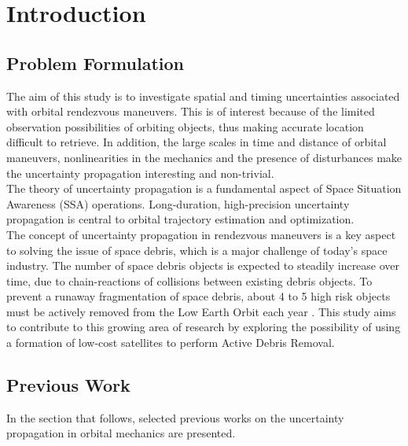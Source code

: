 \section{Introduction}

\subsection{Problem Formulation}

The aim of this study is to investigate spatial and timing uncertainties associated with orbital rendezvous maneuvers. This is of interest because of the limited observation possibilities of orbiting objects, thus making accurate location difficult to retrieve. In addition, the large scales in time and distance of orbital maneuvers, nonlinearities in the mechanics and the presence of disturbances make the uncertainty propagation interesting and non-trivial. \\


The theory of uncertainty propagation is a fundamental aspect of Space Situation Awareness (SSA) operations. Long-duration, high-precision uncertainty propagation is central to orbital trajectory estimation and optimization. \\


The concept of uncertainty propagation in rendezvous maneuvers is a key aspect to solving the issue of space debris, which is a major challenge of today's space industry. The number of space debris objects is expected to steadily increase over time, due to chain-reactions of collisions between existing debris objects. To prevent a runaway fragmentation of space debris, about 4 to 5 high risk objects must be actively removed from the Low Earth Orbit each year \cite{ESA_about_space_debris}. This study aims to contribute to this growing area of research by exploring the possibility of using a formation of low-cost satellites to perform Active Debris Removal. \\


\subsection{Previous Work}

In the section that follows, selected previous works on the uncertainty propagation in orbital mechanics are presented.  \\



